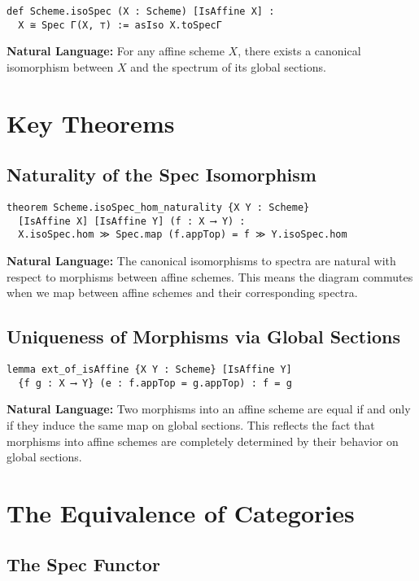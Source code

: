 \documentclass{article}
\theoremstyle{definition}
\begin{document}
\begin{lstlisting}
def Scheme.isoSpec (X : Scheme) [IsAffine X] :
  X ≅ Spec Γ(X, ⊤) := asIso X.toSpecΓ
\end{lstlisting}

\textbf{Natural Language:} For any affine scheme $X$, there exists a canonical isomorphism between $X$ and the spectrum of its global sections.

\section{Key Theorems}

\subsection{Naturality of the Spec Isomorphism}

\begin{lstlisting}
theorem Scheme.isoSpec_hom_naturality {X Y : Scheme}
  [IsAffine X] [IsAffine Y] (f : X ⟶ Y) :
  X.isoSpec.hom ≫ Spec.map (f.appTop) = f ≫ Y.isoSpec.hom
\end{lstlisting}

\textbf{Natural Language:} The canonical isomorphisms to spectra are natural with respect to morphisms between affine schemes. This means the diagram commutes when we map between affine schemes and their corresponding spectra.

\subsection{Uniqueness of Morphisms via Global Sections}

\begin{lstlisting}
lemma ext_of_isAffine {X Y : Scheme} [IsAffine Y]
  {f g : X ⟶ Y} (e : f.appTop = g.appTop) : f = g
\end{lstlisting}

\textbf{Natural Language:} Two morphisms into an affine scheme are equal if and only if they induce the same map on global sections. This reflects the fact that morphisms into affine schemes are completely determined by their behavior on global sections.

\section{The Equivalence of Categories}

\subsection{The Spec Functor}
\end{document}
